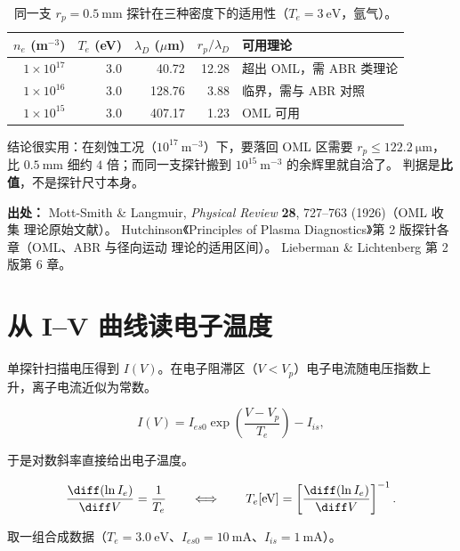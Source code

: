 \begin{table}[htbp]
  \centering
  \caption{同一支 $r_p=0.5\ \mathrm{mm}$ 探针在三种密度下的适用性（$T_e=3\ \mathrm{eV}$，氩气）。}
  \label{tab:app-q-oml}
  \begin{tabular}{@{}rrrrl@{}}
    \toprule
    $n_e$ (m$^{-3}$) & $T_e$ (eV) & $\lambda_D$ ($\mu$m) & $r_p/\lambda_D$ & 可用理论 \\
    \midrule
    $1\times10^{17}$ & 3.0 & 40.72 & 12.28 & 超出 OML，需 ABR 类理论 \\
    $1\times10^{16}$ & 3.0 & 128.76 & 3.88 & 临界，需与 ABR 对照 \\
    $1\times10^{15}$ & 3.0 & 407.17 & 1.23 & OML 可用 \\
    \bottomrule
  \end{tabular}
\end{table}

结论很实用：在刻蚀工况（$10^{17}\ \mathrm{m^{-3}}$）下，要落回 OML 区需要 $r_p\le122.2\ \mathrm{\mu m}$，
比 $0.5\ \mathrm{mm}$ 细约 $4$ 倍；而同一支探针搬到 $10^{15}\ \mathrm{m^{-3}}$ 的余辉里就自洽了。
判据是\textbf{比值}，不是探针尺寸本身。

{\footnotesize
\textbf{出处：} Mott-Smith \& Langmuir, \emph{Physical Review} \textbf{28}, 727--763 (1926)（OML 收集
理论原始文献）。
Hutchinson《Principles of Plasma Diagnostics》第 2 版探针各章（OML、ABR 与径向运动
理论的适用区间）。
Lieberman \& Lichtenberg 第 2 版第 6 章。
}

\section{从 I--V 曲线读电子温度}
\label{sec:app-q-te}

单探针扫描电压得到 $I(V)$。在电子阻滞区（$V<V_p$）电子电流随电压指数上升，离子电流近似为常数。

\begin{equation}
  I(V) = I_{es0}\exp\!\left(\frac{V-V_p}{T_e}\right) - I_{is},
  \label{eq:app-q-iv}
\end{equation}

于是对数斜率直接给出电子温度。

\begin{equation}
  \frac{\diff(\ln I_e)}{\diff V} = \frac{1}{T_e}
  \qquad\Longleftrightarrow\qquad
  T_e[\mathrm{eV}] = \left[\frac{\diff(\ln I_e)}{\diff V}\right]^{-1}.
  \label{eq:app-q-slope}
\end{equation}

取一组合成数据（$T_e=3.0\ \mathrm{eV}$、$I_{es0}=10\ \mathrm{mA}$、$I_{is}=1\ \mathrm{mA}$）。

